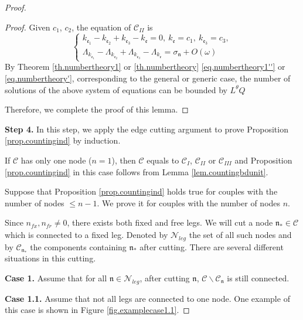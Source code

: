 \begin{proof}
\begin{proof}
     Given $c_1$, $c_2$, the equation of $\mathcal{C}_{II}$ is 
     \begin{equation}
     \begin{cases}
     k_{\mathfrak{e}_1}-k_{\mathfrak{e}_2}+k_{\mathfrak{e}_3}-k_{\mathfrak{e}}=0,\ k_{\mathfrak{e}}=c_1,\ k_{\mathfrak{e}_3}=c_3,
     \\
     \Lambda_{k_{\mathfrak{e}_1}}-\Lambda_{k_{\mathfrak{e}_2}}+\Lambda_{k_{\mathfrak{e}_3}}-\Lambda_{k_{\mathfrak{e}}}=\sigma_{\mathfrak{n}}+O(\omega)
     \end{cases}
     \end{equation}
     By Theorem \ref{th.numbertheory1} or \ref{th.numbertheory} \eqref{eq.numbertheory1''} or \eqref{eq.numbertheory'}, corresponding to the general or generic case, the number of solutions of the above system of equations can be bounded by $ L^\theta Q$
     
     Therefore, we complete the proof of this lemma.
     \end{proof}
    
    \textbf{Step 4.} In this step, we apply the edge cutting argument to prove Proposition \ref{prop.countingind} by induction.
    
    If $\mathcal{C}$ has only one node ($n=1$), then $\mathcal{C}$ equals to $\mathcal{C}_{I}$, $\mathcal{C}_{II}$ or $\mathcal{C}_{III}$ and Proposition \ref{prop.countingind} in this case follows from Lemma \ref{lem.countingbdunit}.
    
    Suppose that Proposition \ref{prop.countingind} holds true for couples with the number of nodes $\le n-1$. We prove it for couples with the number of nodes $n$. 
    
    Since $n_{\textit{fx}}, n_{\textit{fr}}\ne 0$, there exists both fixed and free legs. We will cut a node $\mathfrak{n}_*\in\mathcal{C}$ which is connected to a fixed leg. Denoted by $\mathcal{N}_{leg}$ the set of all such nodes and by $\mathcal{C}_{\mathfrak{n}_*}$ the components containing $\mathfrak{n}_*$ after cutting. There are several different situations in this cutting.
    
    \textbf{Case 1.} Assume that for all $\mathfrak{n}\in \mathcal{N}_{leg}$, after cutting $\mathfrak{n}$, $\mathcal{C}\backslash \mathcal{C}_{\mathfrak{n}}$ is still connected.
    
    \textbf{Case 1.1.} Assume that not all legs are connected to one node. One example of this case is shown in Figure \ref{fig.examplecase1.1}.
    

\end{proof}
